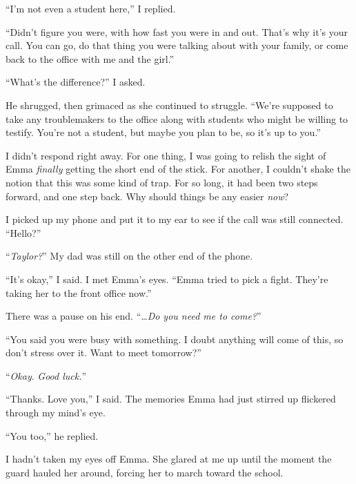 ``I'm not even a student here,'' I replied.



``Didn't figure you were, with how fast you were in and out.  That's why it's your call.  You can go, do that thing you were talking about with your family, or come back to the office with me and the girl.''



``What's the difference?'' I asked.



He shrugged, then grimaced as she continued to struggle.  ``We're supposed to take any troublemakers to the office along with students who might be willing to testify.  You're not a student, but maybe you plan to be, so it's up to you.''



I didn't respond right away.  For one thing, I was going to relish the sight of Emma \emph{finally} getting the short end of the stick.  For another, I couldn't shake the notion that this was some kind of trap.  For so long, it had been two steps forward, and one step back.  Why should things be any easier \emph{now}?



I picked up my phone and put it to my ear to see if the call was still connected.  ``Hello?''



``\emph{Taylor?}'' My dad was still on the other end of the phone.



``It's okay,'' I said.  I met Emma's eyes.  ``Emma tried to pick a fight.  They're taking her to the front office now.''



There was a pause on his end.  ``\ldots\emph{Do you need me to come?}''



``You said you were busy with something.  I doubt anything will come of this, so don't stress over it.  Want to meet tomorrow?''



``\emph{Okay}.  \emph{Good luck.}''



``Thanks.  Love you,'' I said.  The memories Emma had just stirred up flickered through my mind's eye.



``You too,'' he replied.



I hadn't taken my eyes off Emma.  She glared at me up until the moment the guard hauled her around, forcing her to march toward the school.



